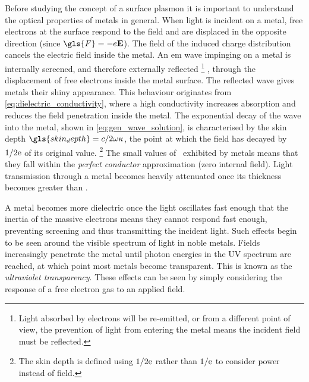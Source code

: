 \documentclass{article}
\begin{document}
Before studying the concept of a surface plasmon it is important to understand the optical properties of metals in general. When light is incident on a metal, free electrons at the surface respond to the field and are displaced in the opposite direction (since $\gls{F}=-e\vec{E}$). The field of the induced charge distribution cancels the electric field inside the metal. An \gls{em} wave impinging on a metal is internally screened{\color{red}, and therefore externally reflected%
\footnote{Light absorbed by electrons will be re-emitted, or from a different point of view, the prevention of light from entering the metal means the incident field must be reflected.}
,} through the displacement of free electrons inside the metal surface. The reflected wave gives metals their shiny appearance. This behaviour originates from \eqref{eq:dielectric_conductivity}, where a high conductivity increases absorption and reduces the field penetration inside the metal. The exponential decay of the wave into the metal, shown in \eqref{eq:gen_wave_solution}, is characterised by the skin depth $\gls{skin_depth} = c/2\omega\kappa$, the point at which the field has decayed by $1/2\mathrm{e}$ of its original value.%
\footnote{The skin depth is defined using $1/2\mathrm{e}$ rather than $1/\mathrm{e}$ to consider power instead of field.}
The small values of \skindepth\ exhibited by metals means that they fall within the \textit{perfect conductor} approximation (zero internal field). Light transmission through a metal becomes heavily attenuated once its thickness becomes greater than \skindepth.

A metal becomes more dielectric once the light oscillates fast enough that the inertia of the {\color{red}massive} electrons means they cannot respond fast enough, preventing screening and thus transmitting the incident light. Such effects begin to be seen around the visible spectrum of light in noble metals. Fields increasingly penetrate the metal until photon energies in the UV spectrum are reached, at which point most metals become transparent. This is known as the \textit{ultraviolet transparency}. These effects can be seen by simply considering the response of a free electron gas to an applied field.
\end{document}
